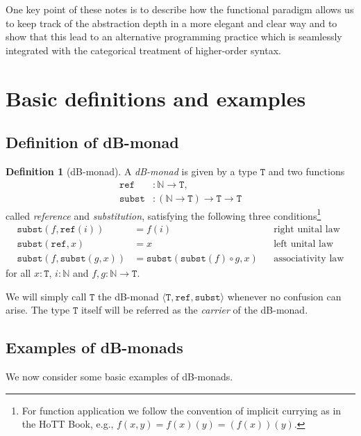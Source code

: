 \documentclass[a4paper,twoside,12pt]{article}
\theoremstyle{definition}
\newtheorem{definition}{Definition}
\theoremstyle{remark}
\theoremstyle{example}
\newcommand{\NN}{\mathbb{N}}
\newcommand{\TT}{\mathtt{T}}
\newcommand{\subst}{\mathtt{subst}}
\newcommand{\refe}{\mathtt{ref}}
\begin{document}
One key point of these notes is to describe how the functional
paradigm allows us to keep track of the abstraction depth in a more
elegant and clear way and to show that this lead to an alternative
programming practice which is seamlessly integrated with the
categorical treatment of higher-order syntax.

\section{Basic definitions and examples}
\label{sec:basic-def}

\subsection{Definition of dB-monad}
\label{sec:basic-defin-example}

\begin{definition}[dB-monad]
  A \emph{dB-monad} is given by a type $\TT$ and two functions
  \begin{align*}
    \refe &\colon \NN \to \TT, \\
    \subst &\colon (\NN \to \TT) \to \TT \to \TT
  \end{align*}
  called \emph{reference} and \emph{substitution}, satisfying the
  following three conditions\footnote{For function application we
    follow the convention of implicit currying as in the HoTT Book,
    e.g., $f(x,y) = f(x)(y) = (f(x))(y)$.}
  \begin{align*}
    \subst(f,\refe(i)) &=  f(i)
    && \text{right unital law} \\
    \subst(\refe, x) &=  x
    && \text{left unital law} \\
    \subst(f, \subst(g, x)) &= \subst(\subst(f) \circ g, x)
    &&\text{associativity law}
  \end{align*}
  for all $x : \TT$, $i :\NN$ and $f,g\colon \NN \to \TT$.
\end{definition}

We will simply call $\TT$ the dB-monad
$\langle \TT, \refe, \subst \rangle$ whenever no confusion can arise.
The type $\TT$ itself will be referred as the \emph{carrier} of the
dB-monad.

\subsection{Examples of dB-monads}
\label{sec:examples-dB-monads}

We now consider some basic examples of dB-monads.
\end{document}
